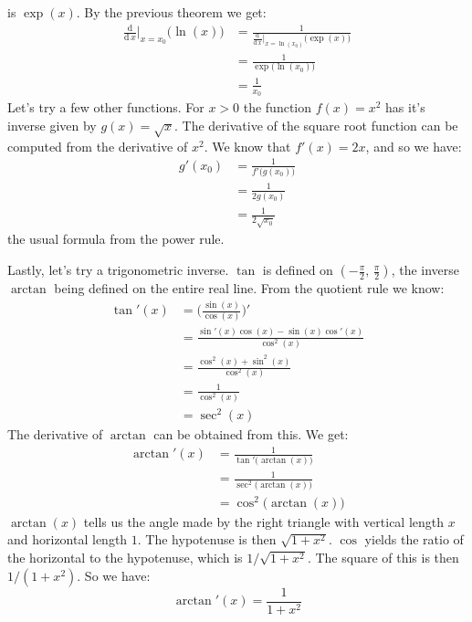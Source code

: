 \documentclass{article}
\theoremstyle{plain}
\begin{document}
    is $\exp(x)$. By the previous theorem we get:
    \begin{align}
        \frac{\textrm{d}}{\textrm{d}\,x}\Big|_{x=x_{0}}\big(\ln(x)\big)
            &=\frac{1}{\frac{\textrm{d}}{\textrm{d}\,x}\big|_{x=\ln(x_{0})}\big(\exp(x)\big)}\\
            &=\frac{1}{\exp\big(\ln(x_{0})\big)}\\
            &=\frac{1}{x_{0}}
    \end{align}
    Let's try a few other functions. For $x>0$ the function
    $f(x)=x^{2}$ has it's inverse given by $g(x)=\sqrt{x}$. The derivative
    of the square root function can be computed from the derivative of $x^2$.
    We know that $f'(x)=2x$, and so we have:
    \begin{align}
        g'(x_{0})&=\frac{1}{f'\big(g(x_{0})\big)}\\
            &=\frac{1}{2g(x_{0})}\\
            &=\frac{1}{2\sqrt{x_{0}}}
    \end{align}
    the usual formula from the power rule.
    \par\hfill\par
    Lastly, let's try a trigonometric inverse. $\tan$ is defined on
    $(-\frac{\pi}{2},\,\frac{\pi}{2})$, the inverse $\arctan$ being defined on
    the entire real line. From the quotient rule we know:
    \begin{align}
        \tan'(x)
            &=\Big(\frac{\sin(x)}{\cos(x)}\Big)'\\
            &=\frac{\sin'(x)\cos(x)-\sin(x)\cos'(x)}{\cos^{2}(x)}\\
            &=\frac{\cos^{2}(x)+\sin^{2}(x)}{\cos^{2}(x)}\\
            &=\frac{1}{\cos^{2}(x)}\\
            &=\sec^{2}(x)
    \end{align}
    The derivative of $\arctan$ can be obtained from this. We get:
    \begin{align}
        \arctan'(x)
            &=\frac{1}{\tan'\big(\arctan(x)\big)}\\
            &=\frac{1}{\sec^{2}\big(\arctan(x)\big)}\\
            &=\cos^{2}\big(\arctan(x)\big)
    \end{align}
    $\arctan(x)$ tells us the angle made by the right triangle with
    vertical length $x$ and horizontal length $1$. The hypotenuse is then
    $\sqrt{1+x^{2}}$. $\cos$ yields the ratio of the horizontal to the
    hypotenuse, which is $1/\sqrt{1+x^{2}}$. The square of this is then
    $1/(1+x^{2})$. So we have:
    \begin{equation}
        \arctan'(x)=\frac{1}{1+x^{2}}
    \end{equation}
\end{document}
